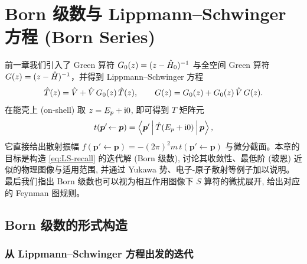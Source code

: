 \chapter{Born 级数与 Lippmann--Schwinger 方程 (Born Series)}\label{ch:born}

前一章我们引入了 Green 算符 $G_0(z)=(z-\hat{H}_0)^{-1}$ 与全空间 Green 算符 $G(z)=(z-\hat{H})^{-1}$，并得到 Lippmann--Schwinger 方程
\begin{equation}
\hat{T}(z)=\hat{V}+\hat{V}\,G_0(z)\,\hat{T}(z),\qquad
G(z)=G_0(z)+G_0(z)\,\hat{V}\,G(z).
\label{eq:LS-recall}
\end{equation}
在能壳上 (on-shell) 取 $z=E_p+\mathrm{i} 0$, 即可得到 $T$ 矩阵元
\begin{equation}
t(\bm p'\!\leftarrow\bm p)=\left\langle \bm p' \,\middle|\, \hat{T}(E_p+\mathrm{i} 0) \,\middle|\, \bm p \right\rangle,
\end{equation}
它直接给出散射振幅 $f(\bm p'\!\leftarrow\bm p)=-(2\pi)^2 m\,t(\bm p'\!\leftarrow\bm p)$ 与微分截面。本章的目标是构造 \eqref{eq:LS-recall} 的迭代解 (Born 级数), 讨论其收敛性、最低阶 (玻恩) 近似的物理图像与适用范围, 并通过 Yukawa 势、电子-原子散射等例子加以说明。最后我们指出 Born 级数也可以视为相互作用图像下 $S$ 算符的微扰展开, 给出对应的 Feynman 图规则。

\section{Born 级数的形式构造}\label{sec:born-formal}

\subsection{从 Lippmann--Schwinger 方程出发的迭代}

